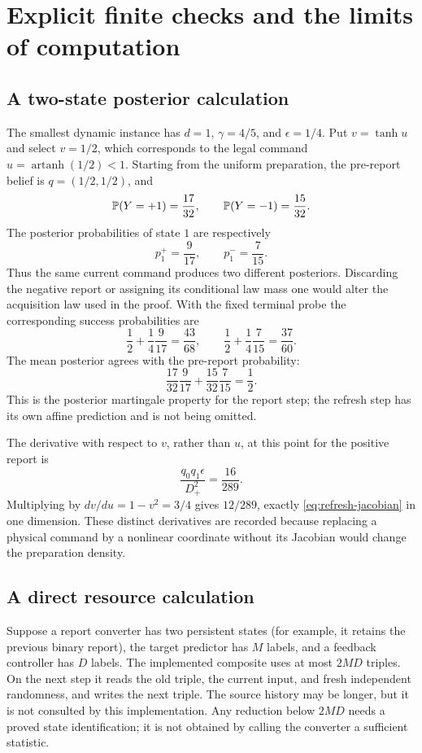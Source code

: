 \section{Explicit finite checks and the limits of computation}
\label{app:finite}
\subsection{A two-state posterior calculation}
The smallest dynamic instance has $d=1$, $\gamma=4/5$, and
$\epsilon=1/4$. Put $v=\tanh u$ and select $v=1/2$, which corresponds
to the legal command $u=\operatorname{artanh}(1/2)<1$. Starting from the
uniform preparation, the pre-report belief is $q=(1/2,1/2)$, and
\[
 \mathbb P(Y=+1)=\frac{17}{32},\qquad
 \mathbb P(Y=-1)=\frac{15}{32}.
\]
The posterior probabilities of state $1$ are respectively
\[
 p_1^+=\frac9{17},\qquad p_1^-=\frac7{15}.
\]
Thus the same current command produces two different posteriors. Discarding
the negative report or assigning its conditional law mass one would alter
the acquisition law used in the proof. With the fixed terminal probe the
corresponding success probabilities are
\[
 \frac12+\frac14\frac9{17}=\frac{43}{68},\qquad
 \frac12+\frac14\frac7{15}=\frac{37}{60}.
\]
The mean posterior agrees with the pre-report probability:
\[
 \frac{17}{32}\frac9{17}+\frac{15}{32}\frac7{15}=\frac12.
\]
This is the posterior martingale property for the report step; the refresh
step has its own affine prediction and is not being omitted.

The derivative with respect to $v$, rather than $u$, at this point for the
positive report is
\[
 \frac{q_0q_1\epsilon}{D_+^2}
 =\frac{16}{289}.
\]
Multiplying by $dv/du=1-v^2=3/4$ gives $12/289$, exactly
\eqref{eq:refresh-jacobian} in one dimension. These distinct derivatives
are recorded because replacing a physical command by a nonlinear
coordinate without its Jacobian would change the preparation density.

\subsection{A direct resource calculation}
Suppose a report converter has two persistent states (for example, it
retains the previous binary report), the target predictor has $M$ labels,
and a feedback controller has $D$ labels. The implemented composite uses
at most $2MD$ triples. On the next step it reads the old triple, the current
input, and fresh independent randomness, and writes the next triple.
The source history may be longer, but it is not consulted by this
implementation. Any reduction below $2MD$ needs a proved state
identification; it is not obtained by calling the converter a sufficient
statistic.

